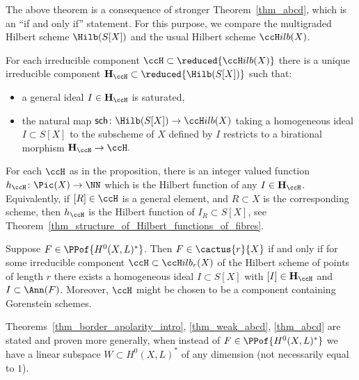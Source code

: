 \documentclass[12pt,a4paper]{article}
\newcommand{\usualHilb}{{\ccH}ilb}
\DeclareMathOperator{\sch}{\mathsf {sch}}
\begin{document}
The above theorem is a consequence of stronger Theorem~\ref{thm_abcd},
   which is an ``if and only if'' statement.
For this purpose, we compare the multigraded Hilbert scheme
$\Hilb(S[X])$ and the usual Hilbert scheme $\usualHilb(X)$.


\begin{prop}\label{prop_distinguished_components}
   For each irreducible component
      $\ccH\subset \reduced{\usualHilb(X)}$
      there is a unique irreducible component $\mathbf{H}_{\ccH} \subset \reduced{\Hilb(S[X])}$ such that:
      \begin{itemize}
       \item a general ideal $I\in \mathbf{H}_{\ccH}$ is saturated,
       \item the natural map $\sch\colon\Hilb(S[X]) \to \usualHilb(X)$
             taking a homogeneous ideal $I\subset S[X]$
             to the subscheme of $X$ defined by $I$
             restricts to a birational morphism
              $\mathbf{H}_{\ccH}\to \ccH.$
      \end{itemize}
\end{prop}

For each $\ccH$ as in the proposition, there is an integer valued function
$h_{\ccH}\colon \Pic(X)\to \NN$
which is the Hilbert function of any $I\in \mathbf{H}_{\ccH}$.
Equivalently,
  if $[R]\in \ccH$ is a general element, and $R\subset X$ is the corresponding scheme, then
  $h_{\ccH}$ is the Hilbert function of $I_R\subset S[X]$, see Theorem~\ref{thm_structure_of_Hilbert_functions_of_fibres}.

\begin{thm}\label{thm_abcd}
   Suppose $F \in \PPof{H^0(X,L)^*}$.
   Then $F\in \cactus{r}{X}$ if and only if for some irreducible component
   $\ccH\subset \usualHilb_r(X)$ of the Hilbert scheme of points
     of length $r$ there exists a homogeneous ideal $I \subset S[X]$
     with $[I]\in \mathbf{H}_{\ccH}$ and $I \subset \Ann(F)$.
   Moreover, $\ccH$ might be chosen to be a component containing
     Gorenstein schemes.
\end{thm}

Theorems~\ref{thm_border_apolarity_intro}, \ref{thm_weak_abcd}, \ref{thm_abcd} are stated and proven more generally, when instead of $F\in \PPof{H^0(X,L)^*}$ we have a linear subspace $W\subset H^0(X,L)^*$ of any dimension (not necessarily equal to $1$).
\end{document}
